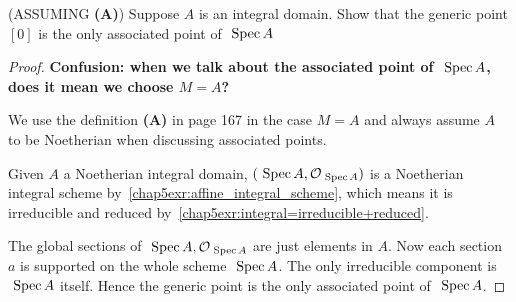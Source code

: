 \begin{exr}\label{chap5exr:integral_associated_point_generic_point}(ASSUMING \textbf{(A)})
Suppose $A$ is an integral domain. Show that the generic point $[0]$ is the only associated point of $\text{ Spec\,} A$
\end{exr}
\begin{proof}
\textbf{Confusion: when we talk about the associated point of $\text{ Spec\,} A$, does it mean we choose $M=A$?}
 
We use the definition \textbf{(A)} in page 167 in the case $M=A$ and always assume $A$ to be Noetherian when discussing associated points.

Given $A$  a Noetherian integral domain, $(\text{ Spec\,} A,{\cal O}_{\text{ Spec\,} A})$ is a Noetherian integral scheme by~\ref{chap5exr:affine_integral_scheme}, which means it is irreducible and reduced by~\ref{chap5exr:integral=irreducible+reduced}. 

The global sections of $\text{ Spec\,} A,{\cal O}_{\text{ Spec\,} A}$ are just elements in $A$. Now each section $a$ is supported on the whole scheme $\text{ Spec\,} A$. The only irreducible component is $\text{ Spec\,} A$ itself. Hence the generic point is the only associated point of $\text{ Spec\,} A$.
\end{proof}

